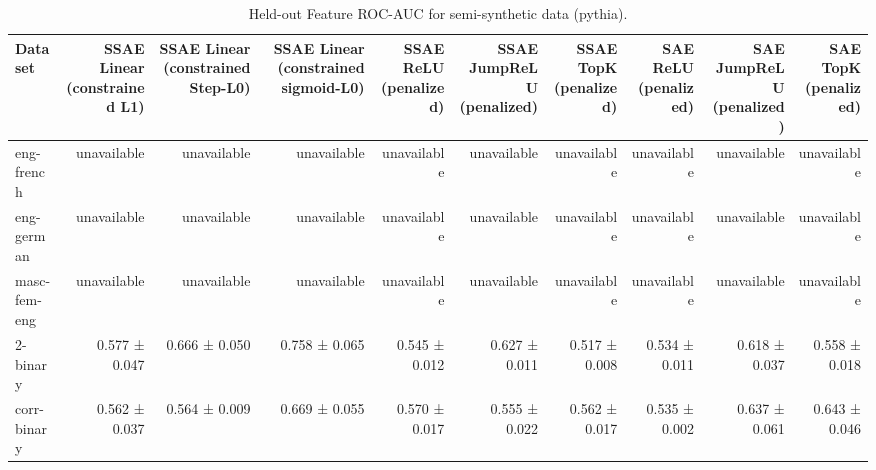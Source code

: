 \begin{table}[t]
\centering
\caption{Held-out Feature ROC-AUC for semi-synthetic data (pythia).}
\label{tab:semisynthetic-pythia-sae-auc}
\begin{tabular}{lrrrrrrrrr}
\toprule
Dataset & SSAE Linear (constrained L1) & SSAE Linear (constrained Step-L0) & SSAE Linear (constrained sigmoid-L0) & SSAE ReLU (penalized) & SSAE JumpReLU (penalized) & SSAE TopK (penalized) & SAE ReLU (penalized) & SAE JumpReLU (penalized) & SAE TopK (penalized) \\
\midrule
eng-french & unavailable & unavailable & unavailable & unavailable & unavailable & unavailable & unavailable & unavailable & unavailable \\
eng-german & unavailable & unavailable & unavailable & unavailable & unavailable & unavailable & unavailable & unavailable & unavailable \\
masc-fem-eng & unavailable & unavailable & unavailable & unavailable & unavailable & unavailable & unavailable & unavailable & unavailable \\
2-binary & 0.577 ± 0.047 & 0.666 ± 0.050 & 0.758 ± 0.065 & 0.545 ± 0.012 & 0.627 ± 0.011 & 0.517 ± 0.008 & 0.534 ± 0.011 & 0.618 ± 0.037 & 0.558 ± 0.018 \\
corr-binary & 0.562 ± 0.037 & 0.564 ± 0.009 & 0.669 ± 0.055 & 0.570 ± 0.017 & 0.555 ± 0.022 & 0.562 ± 0.017 & 0.535 ± 0.002 & 0.637 ± 0.061 & 0.643 ± 0.046 \\
\bottomrule
\end{tabular}
\end{table}
